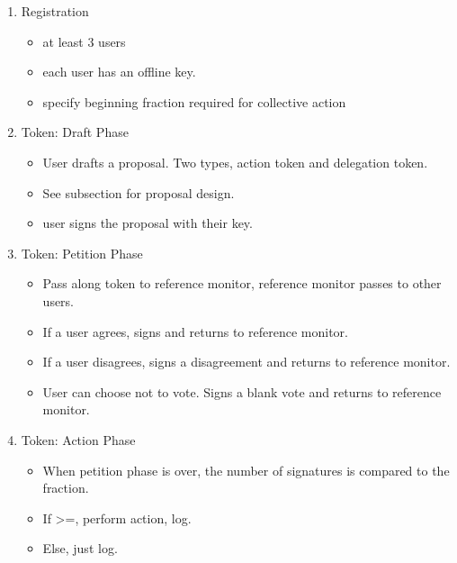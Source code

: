 \begin{enumerate}
\item Registration
    \begin{itemize}
    \item at least 3 users
    \item each user has an offline key.
    \item specify beginning fraction required for collective action
    \end{itemize}
\item Token: Draft Phase
    \begin{itemize}
    \item User drafts a proposal. Two types, action token and delegation token.
    \item See subsection for proposal design.
    \item user signs the proposal with their key.
    \end{itemize}
\item Token: Petition Phase
    \begin{itemize}
    \item Pass along token to reference monitor, reference monitor passes to
    other users.
    \item If a user agrees, signs and returns to reference monitor.
    \item If a user disagrees, signs a disagreement and returns to reference
    monitor.
    \item User can choose not to vote. Signs a blank vote and returns to
    reference monitor.
    \end{itemize}
\item Token: Action Phase
    \begin{itemize}
    \item When petition phase is over, the number of signatures is compared to
    the fraction.
    \item If >=, perform action, log.
    \item Else, just log.
    \end{itemize}
\end{enumerate}

